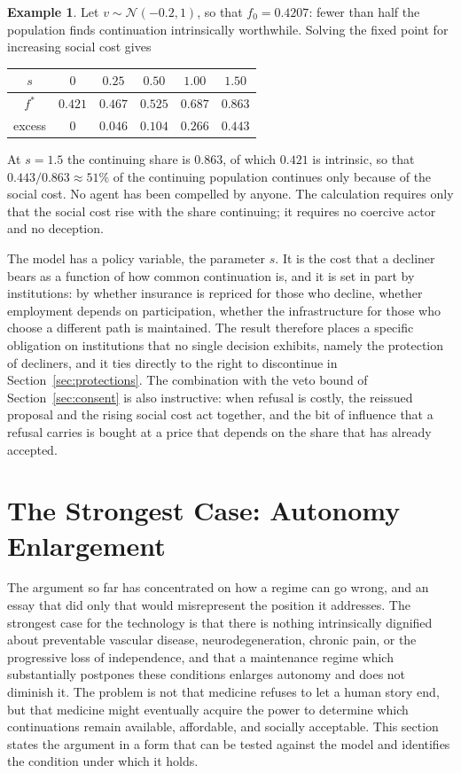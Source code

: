 \documentclass[11pt]{article}
\theoremstyle{plain}
\theoremstyle{definition}
\newtheorem{example}{Example}
\theoremstyle{remark}
\begin{document}
\begin{example}
Let $v\sim\mathcal N(-0.2,1)$, so that $f_0=0.4207$: fewer than half the population finds continuation intrinsically worthwhile. Solving the fixed point for increasing social cost gives
\begin{center}
\begin{tabular}{cccccc}
\toprule
$s$ & $0$ & $0.25$ & $0.50$ & $1.00$ & $1.50$\\
\midrule
$f^\ast$ & $0.421$ & $0.467$ & $0.525$ & $0.687$ & $0.863$\\
excess & $0$ & $0.046$ & $0.104$ & $0.266$ & $0.443$\\
\bottomrule
\end{tabular}
\end{center}
At $s=1.5$ the continuing share is $0.863$, of which $0.421$ is intrinsic, so that $0.443/0.863\approx51\%$ of the continuing population continues only because of the social cost. No agent has been compelled by anyone. The calculation requires only that the social cost rise with the share continuing; it requires no coercive actor and no deception.
\end{example}

The model has a policy variable, the parameter $s$. It is the cost that a decliner bears as a function of how common continuation is, and it is set in part by institutions: by whether insurance is repriced for those who decline, whether employment depends on participation, whether the infrastructure for those who choose a different path is maintained. The result therefore places a specific obligation on institutions that no single decision exhibits, namely the protection of decliners, and it ties directly to the right to discontinue in Section~\ref{sec:protections}. The combination with the veto bound of Section~\ref{sec:consent} is also instructive: when refusal is costly, the reissued proposal and the rising social cost act together, and the bit of influence that a refusal carries is bought at a price that depends on the share that has already accepted.

\section{The Strongest Case: Autonomy Enlargement}\label{sec:strongest}

The argument so far has concentrated on how a regime can go wrong, and an essay that did only that would misrepresent the position it addresses. The strongest case for the technology is that there is nothing intrinsically dignified about preventable vascular disease, neurodegeneration, chronic pain, or the progressive loss of independence, and that a maintenance regime which substantially postpones these conditions enlarges autonomy and does not diminish it. The problem is not that medicine refuses to let a human story end, but that medicine might eventually acquire the power to determine which continuations remain available, affordable, and socially acceptable. This section states the argument in a form that can be tested against the model and identifies the condition under which it holds.
\end{document}
